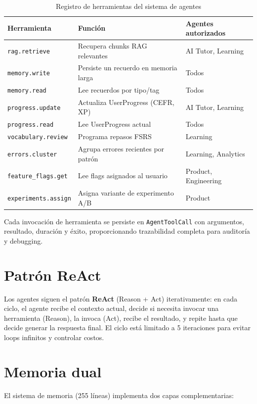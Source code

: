 \documentclass[10pt,a4paper,oneside]{report}
\begin{document}
\begin{table}[H]
\centering
\begin{tabular}{p{3cm}p{4.5cm}p{5.5cm}}
\toprule
\textbf{Herramienta} & \textbf{Función} & \textbf{Agentes autorizados} \\
\midrule
\texttt{rag.retrieve} & Recupera chunks RAG relevantes & AI Tutor, Learning \\
\texttt{memory.write} & Persiste un recuerdo en memoria larga & Todos \\
\texttt{memory.read} & Lee recuerdos por tipo/tag & Todos \\
\texttt{progress.update} & Actualiza UserProgress (CEFR, XP) & AI Tutor, Learning \\
\texttt{progress.read} & Lee UserProgress actual & Todos \\
\texttt{vocabulary.review} & Programa repasos FSRS & Learning \\
\texttt{errors.cluster} & Agrupa errores recientes por patrón & Learning, Analytics \\
\texttt{feature\_flags.get} & Lee flags asignados al usuario & Product, Engineering \\
\texttt{experiments.assign} & Asigna variante de experimento A/B & Product \\
\bottomrule
\end{tabular}
\caption{Registro de herramientas del sistema de agentes}
\end{table}

Cada invocación de herramienta se persiste en \texttt{AgentToolCall} con argumentos, resultado, duración y éxito, proporcionando trazabilidad completa para auditoría y debugging.

\section{Patrón ReAct}
Los agentes siguen el patrón \textbf{ReAct} (Reason + Act) iterativamente: en cada ciclo, el agente recibe el contexto actual, decide si necesita invocar una herramienta (Reason), la invoca (Act), recibe el resultado, y repite hasta que decide generar la respuesta final. El ciclo está limitado a 5 iteraciones para evitar loops infinitos y controlar costos.

\section{Memoria dual}
El sistema de memoria (255 líneas) implementa dos capas complementarias:
\end{document}
